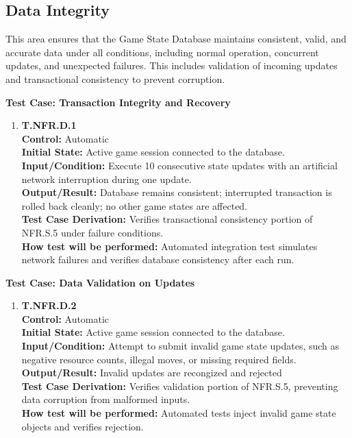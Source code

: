 \documentclass[12pt, titlepage]{article}
\begin{document}
\subsection{Data Integrity}

This area ensures that the Game State Database maintains consistent, valid, and accurate data under all conditions, including normal operation, concurrent updates, and unexpected failures. This includes validation of incoming updates and transactional consistency to prevent corruption.

\textbf{Test Case: Transaction Integrity and Recovery}

\begin{enumerate}
\item \textbf{T.NFR.D.1} \\
\textbf{Control:} Automatic \\
\textbf{Initial State:} Active game session connected to the database. \\
\textbf{Input/Condition:} Execute 10 consecutive state updates with an artificial network interruption during one update. \\
\textbf{Output/Result:} Database remains consistent; interrupted transaction is rolled back cleanly; no other game states are affected. \\
\textbf{Test Case Derivation:} Verifies transactional consistency portion of NFR.S.5 under failure conditions. \\
\textbf{How test will be performed:} Automated integration test simulates network failures and verifies database consistency after each run.
\end{enumerate}

\textbf{Test Case: Data Validation on Updates}

\begin{enumerate}
\item \textbf{T.NFR.D.2} \\
\textbf{Control:} Automatic \\
\textbf{Initial State:} Active game session connected to the database. \\
\textbf{Input/Condition:} Attempt to submit invalid game state updates, such as negative resource counts, illegal moves, or missing required fields. \\
\textbf{Output/Result:} Invalid updates are recongized and rejected \\
\textbf{Test Case Derivation:} Verifies validation portion of NFR.S.5, preventing data corruption from malformed inputs. \\
\textbf{How test will be performed:} Automated tests inject invalid game state objects and verifies rejection.\\
\end{enumerate}
\end{document}
